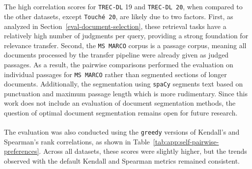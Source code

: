 \\\\
The high correlation scores for \texttt{TREC-DL} 19 and \texttt{TREC-DL 20}, when compared to the other datasets, except \texttt{Touché 20}, are likely due to two factors. First, as analyzed in Section~\ref{eval-document-selection}, these retrieval tasks have a relatively high number of judgments per query, providing a strong foundation for relevance transfer. Second, the \texttt{MS MARCO} corpus is a passage corpus, meaning all documents processed by the transfer pipeline were already given as judged passages. As a result, the pairwise comparisons performed the evaluation on individual passages for \texttt{MS MARCO} rather than segmented sections of longer documents. Additionally, the segmentation using \texttt{spaCy}  segments text based on punctuation and maximum passage length which is more rudimentary. Since this work does not include an evaluation of document segmentation methods, the question of optimal document segmentation remains open for future research.
\\\\
The evaluation was also conducted using the \texttt{greedy} versions of Kendall's and Spearman's rank correlations, as shown in Table~\ref{tab:app:self-pairwise-preferences}. Across all datasets, these scores were slightly higher, but the trends observed with the default Kendall and Spearman metrics remained consistent.
\pagebreak
